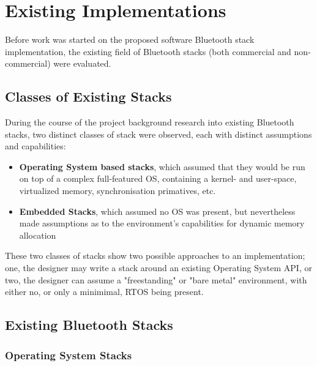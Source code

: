 \chapter{Existing Implementations}
\label{Chapter 2}

Before work was started on the proposed software Bluetooth stack implementation, the existing field of Bluetooth stacks (both commercial and non-commercial) were evaluated.

\section{Classes of Existing Stacks}

During the course of the project background research into existing Bluetooth stacks, two distinct classes of stack were observed, each with distinct assumptions and capabilities:

\begin{itemize}
	\item \textbf{Operating System based stacks}, which assumed that they would be run on top of a complex full-featured OS, containing a kernel- and user-space, virtualized memory, synchronisation primatives, etc.
	\item \textbf{Embedded Stacks}, which assumed no OS was present, but nevertheless made assumptions as to the environment's capabilities for dynamic memory allocation
\end{itemize}

These two classes of stacks show two possible approaches to an implementation; one, the designer may write a stack around an existing Operating System API, or two, the designer can assume a "freestanding" or "bare metal" environment, with either no, or only a minimimal, RTOS being present.

\section{Existing Bluetooth Stacks}


\subsection{Operating System Stacks}

